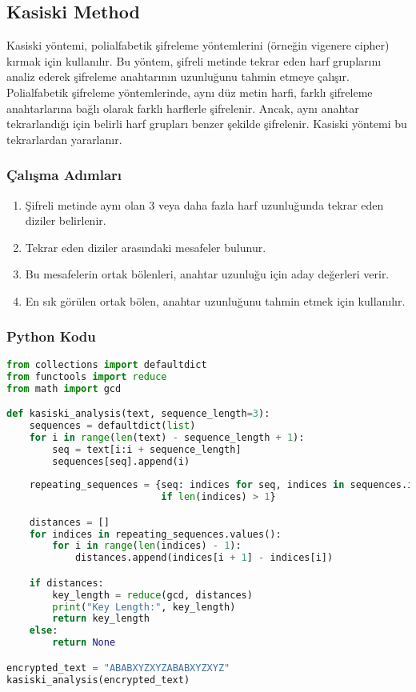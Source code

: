 \newpage

\subsection{Kasiski Method}

Kasiski yöntemi, polialfabetik şifreleme yöntemlerini (örneğin vigenere cipher) kırmak için kullanılır. Bu yöntem, şifreli metinde tekrar eden harf gruplarını analiz ederek şifreleme anahtarının uzunluğunu tahmin etmeye çalışır. Polialfabetik şifreleme yöntemlerinde, aynı düz metin harfi, farklı şifreleme anahtarlarına bağlı olarak farklı harflerle şifrelenir. Ancak, aynı anahtar tekrarlandığı için belirli harf grupları benzer şekilde şifrelenir. Kasiski yöntemi bu tekrarlardan yararlanır.

\subsubsection{Çalışma Adımları}

\begin{enumerate}
    \item Şifreli metinde aynı olan 3 veya daha fazla harf uzunluğunda tekrar eden diziler belirlenir.
    \item Tekrar eden diziler arasındaki mesafeler bulunur.
    \item Bu mesafelerin ortak bölenleri, anahtar uzunluğu için aday değerleri verir.
    \item En sık görülen ortak bölen, anahtar uzunluğunu tahmin etmek için kullanılır.
\end{enumerate}

\subsubsection{Python Kodu}

\begin{lstlisting}[language=Python]
from collections import defaultdict
from functools import reduce
from math import gcd

def kasiski_analysis(text, sequence_length=3):
    sequences = defaultdict(list)
    for i in range(len(text) - sequence_length + 1):
        seq = text[i:i + sequence_length]
        sequences[seq].append(i)
        
    repeating_sequences = {seq: indices for seq, indices in sequences.items()
                           if len(indices) > 1}

    distances = []
    for indices in repeating_sequences.values():
        for i in range(len(indices) - 1):
            distances.append(indices[i + 1] - indices[i])

    if distances:
        key_length = reduce(gcd, distances)
        print("Key Length:", key_length)
        return key_length
    else:
        return None

encrypted_text = "ABABXYZXYZABABXYZXYZ"
kasiski_analysis(encrypted_text)
\end{lstlisting}

